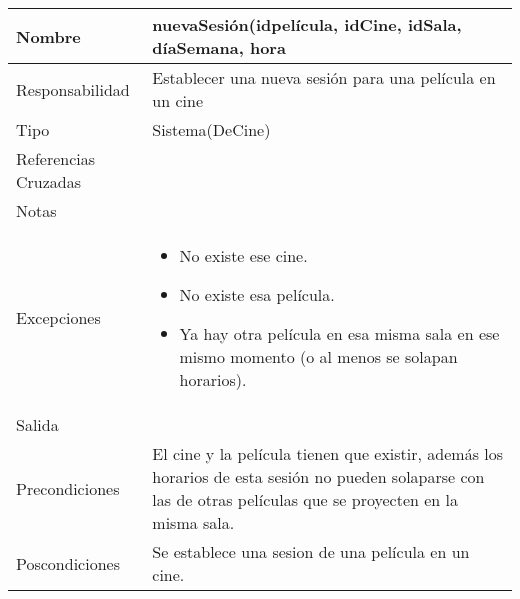 \documentclass{article}
\begin{document}
\begin{table}[h]
\begin{tabular}{|l|l|l|l|l|l|}
\hline
\multicolumn{2}{|p{3cm}|}{Nombre} & \multicolumn{4}{p{10cm}|}{\textbf{nuevaSesión(idpelícula, idCine, idSala, díaSemana, hora}}\\
\hline
\multicolumn{2}{|p{3cm}|}{Responsabilidad} & \multicolumn{4}{p{10cm}|}{Establecer una nueva sesión para una película en un cine} \\
\hline
\multicolumn{2}{|p{3cm}|}{Tipo} & \multicolumn{4}{p{10cm}|}{Sistema(DeCine)} \\
\hline
\multicolumn{2}{|p{3cm}|}{Referencias Cruzadas} & \multicolumn{4}{p{10cm}|}{} \\
\hline
\multicolumn{2}{|p{3cm}|}{Notas} & \multicolumn{4}{p{10cm}|}{} \\
\hline
\multicolumn{2}{|p{3cm}|}{Excepciones} & \multicolumn{4}{p{10cm}|}{\begin{itemize}
\item No existe ese cine.
\item No existe esa película.
\item Ya hay otra película en esa misma sala en ese mismo momento (o al menos se solapan horarios).
\end{itemize}} \\
\hline
\multicolumn{2}{|p{3cm}|}{Salida} & \multicolumn{4}{p{10cm}|}{} \\
\hline
\multicolumn{2}{|p{3cm}|}{Precondiciones} & \multicolumn{4}{p{10cm}|}{El cine y la película tienen que existir, además los horarios de esta sesión no pueden solaparse con las de otras películas que se proyecten en la misma sala.} \\
\hline
\multicolumn{2}{|p{3cm}|}{Poscondiciones} & \multicolumn{4}{p{10cm}|}{Se establece una sesion de una película en un cine.} \\
\hline
\end{tabular}
\end{table}
\end{document}
